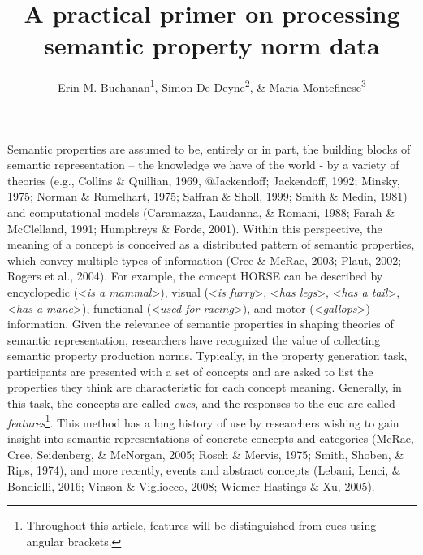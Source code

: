\documentclass[man]{apa6}
\title{A practical primer on processing semantic property norm data}
\author{Erin M. Buchanan\textsuperscript{1}, Simon De Deyne\textsuperscript{2}, \& Maria Montefinese\textsuperscript{3}}
\date{}
\affiliation{
\vspace{0.5cm}
\textsuperscript{1} Harrisburg University of Science and Technology\\\textsuperscript{2} The University of Melbourne\\\textsuperscript{3} University of Padua}
\let\rmarkdownfootnote\footnote%
\def\footnote{\protect\rmarkdownfootnote}
\begin{document}
\maketitle

Semantic properties are assumed to be, entirely or in part, the building blocks of semantic representation -- the knowledge we have of the world - by a variety of theories (e.g., Collins \& Quillian, 1969, @Jackendoff; Jackendoff, 1992; Minsky, 1975; Norman \& Rumelhart, 1975; Saffran \& Sholl, 1999; Smith \& Medin, 1981) and computational models (Caramazza, Laudanna, \& Romani, 1988; Farah \& McClelland, 1991; Humphreys \& Forde, 2001). Within this perspective, the meaning of a concept is conceived as a distributed pattern of semantic properties, which convey multiple types of information (Cree \& McRae, 2003; Plaut, 2002; Rogers et al., 2004). For example, the concept HORSE can be described by encyclopedic (\textless{}\emph{is a mammal}\textgreater{}), visual (\textless{}\emph{is furry}\textgreater{}, \textless{}\emph{has legs}\textgreater{}, \textless{}\emph{has a tail}\textgreater{}, \textless{}\emph{has a mane}\textgreater{}), functional (\textless{}\emph{used for racing}\textgreater{}), and motor (\textless{}\emph{gallops}\textgreater{}) information. Given the relevance of semantic properties in shaping theories of semantic representation, researchers have recognized the value of collecting semantic property production norms. Typically, in the property generation task, participants are presented with a set of concepts and are asked to list the properties they think are characteristic for each concept meaning. Generally, in this task, the concepts are called \emph{cues}, and the responses to the cue are called \emph{features}\footnote{Throughout this article, features will be distinguished from cues using angular brackets.}. This method has a long history of use by researchers wishing to gain insight into semantic representations of concrete concepts and categories (McRae, Cree, Seidenberg, \& McNorgan, 2005; Rosch \& Mervis, 1975; Smith, Shoben, \& Rips, 1974), and more recently, events and abstract concepts (Lebani, Lenci, \& Bondielli, 2016; Vinson \& Vigliocco, 2008; Wiemer-Hastings \& Xu, 2005).
\end{document}
